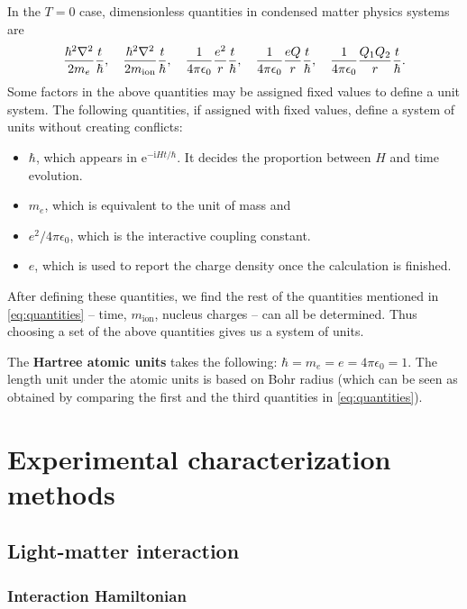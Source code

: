 \documentclass[hyperref, a4paper, 12pt]{report}
\newcommand*{\ii}{\mathrm{i}}
\newcommand*{\ee}{\mathrm{e}}
\newcommand*{\concept}[1]{{\textbf{#1}}}
\begin{document}
In the $T=0$ case, 
dimensionless quantities in condensed matter physics systems are 
\begin{equation}
    \frac{\hbar^2 \laplacian}{2 m_e} \frac{t}{\hbar}, 
    \quad \frac{\hbar^2 \laplacian}{2 m_{\text{ion}}} \frac{t}{\hbar}, 
    \quad \frac{1}{4 \pi \epsilon_0} \frac{e^2}{r} \frac{t}{\hbar}, 
    \quad \frac{1}{4 \pi \epsilon_0} \frac{eQ}{r} \frac{t}{\hbar},
    \quad \frac{1}{4 \pi \epsilon_0} \frac{Q_1 Q_2}{r} \frac{t}{\hbar}. 
    \label{eq:quantities}
\end{equation}
Some factors in the above quantities may be assigned fixed values to define a unit system.
The following quantities, if assigned with fixed values, define a system of units without creating conflicts:
\begin{itemize}
    \item $\hbar$, which appears in $\ee^{- \ii H t / \hbar}$. 
    It decides the proportion between $H$ and time evolution.
    \item $m_e$, which is equivalent to the unit of mass
    and 
    \item $e^2 / 4\pi \epsilon_0$, which is the interactive coupling constant.
    \item $e$, which is used to report the charge density once the calculation is finished.
\end{itemize}
After defining these quantities,
we find the rest of the quantities mentioned in \eqref{eq:quantities} -- 
time, $m_{\text{ion}}$, nucleus charges -- can all be determined.
Thus choosing a set of the above quantities gives us a system of units.

The \concept{Hartree atomic units} takes the following: $\hbar = m_e = e = 4 \pi \epsilon_0 = 1$.
The length unit under the atomic units is based on Bohr radius
(which can be seen as obtained by comparing the first and the third quantities in \eqref{eq:quantities}).

\chapter{Experimental characterization methods}

\section{Light-matter interaction}

\subsection{Interaction Hamiltonian}
\end{document}
